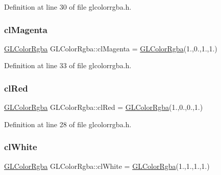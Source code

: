Definition at line 30 of file glcolorrgba.\+h.

\mbox{\label{class_g_l_color_rgba_a38ff3538a96d418ffe8e80ada6fc16be}} 
\subsubsection{\texorpdfstring{clMagenta}{clMagenta}}
{\footnotesize\ttfamily \mbox{\hyperlink{class_g_l_color_rgba}{G\+L\+Color\+Rgba}} G\+L\+Color\+Rgba\+::cl\+Magenta = \mbox{\hyperlink{class_g_l_color_rgba}{G\+L\+Color\+Rgba}}(1.,0.,1.,1.)\hspace{0.3cm}{\ttfamily [static]}}



Definition at line 33 of file glcolorrgba.\+h.

\mbox{\label{class_g_l_color_rgba_aa83b7d12e38e4a7e649c4ce34874ac55}} 
\subsubsection{\texorpdfstring{clRed}{clRed}}
{\footnotesize\ttfamily \mbox{\hyperlink{class_g_l_color_rgba}{G\+L\+Color\+Rgba}} G\+L\+Color\+Rgba\+::cl\+Red = \mbox{\hyperlink{class_g_l_color_rgba}{G\+L\+Color\+Rgba}}(1.,0.,0.,1.)\hspace{0.3cm}{\ttfamily [static]}}



Definition at line 28 of file glcolorrgba.\+h.

\mbox{\label{class_g_l_color_rgba_a71745b9d605d383870b32d83c79908dd}} 
\subsubsection{\texorpdfstring{clWhite}{clWhite}}
{\footnotesize\ttfamily \mbox{\hyperlink{class_g_l_color_rgba}{G\+L\+Color\+Rgba}} G\+L\+Color\+Rgba\+::cl\+White = \mbox{\hyperlink{class_g_l_color_rgba}{G\+L\+Color\+Rgba}}(1.,1.,1.,1.)\hspace{0.3cm}{\ttfamily [static]}}




